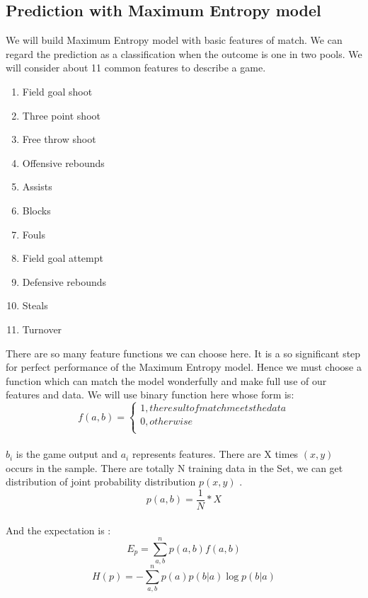 \documentclass[sigconf]{acmart}
\begin{document}
\subsection{Prediction with Maximum Entropy model}
We will build Maximum Entropy model with basic features of match. We can regard the prediction as a classification when the outcome is one in two pools. 
We will consider about 11 common features to describe a game. 
\begin{enumerate}
    \item Field goal shoot
    \item Three point shoot
    \item Free throw shoot
    \item Offensive rebounds
    \item Assists
    \item Blocks
    \item Fouls
    \item Field goal attempt
    \item Defensive rebounds
    \item Steals
    \item Turnover
\end{enumerate}
There are so many feature functions we can choose here. It is a so significant step for perfect performance of the Maximum Entropy model. Hence we must choose a function which can match the model wonderfully and make full use of our features and data. \cite{cite08} We will use binary function here whose form is:\\
$$ f(a,b)=\left\{
\begin{aligned}
1, the result of match meets the data\\
0 , otherwise\\
\end{aligned}
\right.
$$\\
$b_i$ is the game output and $a_i$ represents features. There are X times $(x,y)$ occurs in the sample. There are totally N training data in the Set, we can get distribution of joint probability distribution $p (x, y)$ \cite{cite09}.
\begin{equation*}
p(a,b) = \frac{1}{N} * X
\end{equation*}\\
And the expectation is :
\begin{equation*}
E_p = \sum_{a,b}^n p(a,b)f(a,b)
\end{equation*}
\begin{equation*}
H(p) = -\sum_{a,b}^n p(a)p(b|a)\log p(b|a)
\end{equation*}
\end{document}
